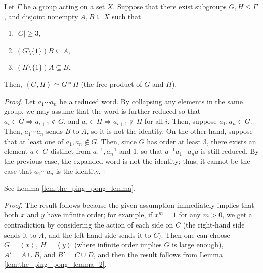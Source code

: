 \documentclass[12pt]{article}
\begin{document}
\begin{lemma}\label{lem:the_ping_pong_lemma_2} Let $\Gamma$ be a group acting on a set $X$.
    Suppose that there exist subgroups $G,H \leq \Gamma$, and disjoint nonempty $A,B \subseteq X$ such that \begin{enumerate}
        \item $|G| \geq 3$, \item $(G \setminus \{1\})B \subseteq A$, \item $(H \setminus \{1\})A \subseteq B$.
    \end{enumerate}
    Then, $\left<G,H\right> \simeq G * H$ (the free product of $G$ and $H$).
\end{lemma}
\begin{proof}
    Let $a_1 \cdots a_n$ be a reduced word.
    By collapsing any elements in the same group, we may assume that the word is further reduced so that $a_i \in G \Rightarrow a_{i+1} \not\in G$, and $a_i \in H \Rightarrow a_{i+1} \not\in H$ for all $i$.
    Then, suppose $a_1,a_n \in G$.
    Then, $a_1 \cdots a_n$ sends $B$ to $A$, so it is not the identity.
    On the other hand, suppose that at least one of $a_1,a_n \not\in G$.
    Then, since $G$ has order at least $3$, there exists an element $a \in G$ distinct from $a_1^{-1}, a_n^{-1}$ and $1$, so that $a^{-1}a_1 \cdots a_na$ is still reduced.
    By the previous case, the expanded word is not the identity; thus, it cannot be the case that $a_1 \cdots a_n$ is the identity.
\end{proof}

\begin{corollary}\label{cor:the_ping_pong_lemma}
    See Lemma \ref{lem:the_ping_pong_lemma}.
\end{corollary}
\begin{proof}
    The result follows because the given assumption immediately implies that both $x$ and $y$ have infinite order; for example, if $x^m = 1$ for any $m > 0$, we get a contradiction by considering the action of each side on $C$ (the right-hand side sends it to $A$, and the left-hand side sends it to $C$).
    Then one can choose $G = \left<x\right>$, $H = \left<y\right>$ (where infinite order implies $G$ is large enough), $A' = A \cup B$, and $B' = C \cup D$, and then the result follows from Lemma \ref{lem:the_ping_pong_lemma_2}.
\end{proof}
\end{document}
